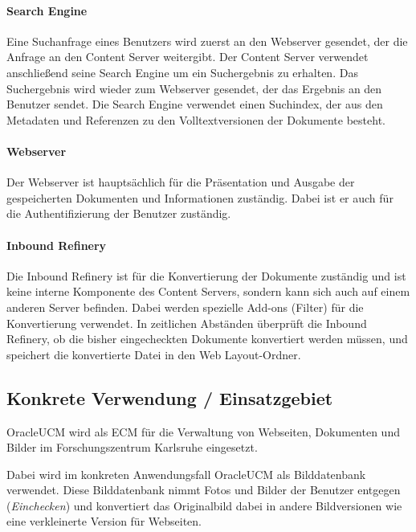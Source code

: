 \paragraph{Search Engine}
Eine Suchanfrage eines Benutzers wird zuerst an den Webserver gesendet, der die Anfrage an den Content Server weitergibt.
Der Content Server verwendet anschließend seine Search Engine um ein Suchergebnis zu erhalten.
Das Suchergebnis wird wieder zum Webserver gesendet, der das Ergebnis an den Benutzer sendet.
Die Search Engine verwendet einen Suchindex, der aus den Metadaten und Referenzen zu den Volltextversionen der Dokumente besteht.

\paragraph{Webserver}
Der Webserver ist hauptsächlich für die Präsentation und Ausgabe der gespeicherten Dokumenten und Informationen zuständig.
Dabei ist er auch für die Authentifizierung der Benutzer zuständig.
\paragraph{Inbound Refinery}
Die Inbound Refinery ist für die Konvertierung der Dokumente zuständig und ist keine interne Komponente des Content Servers, sondern kann sich auch auf einem anderen Server befinden.
Dabei werden spezielle Add-ons (Filter) für die Konvertierung verwendet.
In zeitlichen Abständen überprüft die Inbound Refinery, ob die bisher eingecheckten Dokumente konvertiert werden müssen, und speichert die konvertierte Datei in den Web Layout-Ordner.

\subsection{Konkrete Verwendung / Einsatzgebiet}

\gls{OracleUCM} wird als \gls{ECM} für die Verwaltung von Webseiten, Dokumenten und Bilder im Forschungszentrum Karlsruhe eingesetzt.

Dabei wird im konkreten Anwendungsfall \gls{OracleUCM} als Bilddatenbank verwendet.
Diese Bilddatenbank nimmt Fotos und Bilder der Benutzer entgegen (\textit{Einchecken}) und konvertiert das Originalbild dabei in andere Bildversionen wie eine verkleinerte Version für Webseiten.

